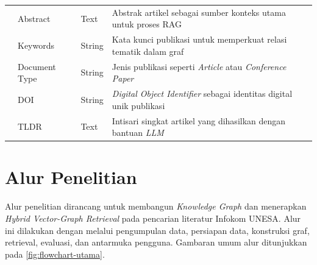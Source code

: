 \begin{longtable}{P{0.14\textwidth}>{\raggedright\arraybackslash}p{0.20\textwidth}P{0.12\textwidth}>{\raggedright\arraybackslash}p{0.40\textwidth}}
                              & Abstract              & Text               & Abstrak artikel sebagai sumber konteks utama untuk proses RAG                       \\ 
                              & Keywords              & String             & Kata kunci publikasi untuk memperkuat relasi tematik dalam graf                     \\ 
                              & Document Type         & String             & Jenis publikasi seperti \textit{Article} atau \textit{Conference Paper}             \\ 
                              & DOI                   & String             & \textit{Digital Object Identifier} sebagai identitas digital unik publikasi         \\ 
                              & TLDR                  & Text               & Intisari singkat artikel yang dihasilkan dengan bantuan \textit{LLM}                \\
\end{longtable}
\endgroup

\section{Alur Penelitian}

Alur penelitian dirancang untuk membangun \textit{Knowledge Graph} dan menerapkan \textit{Hybrid Vector-Graph Retrieval} pada pencarian literatur Infokom UNESA. Alur ini dilakukan dengan melalui pengumpulan data, persiapan data, konstruksi graf, retrieval, evaluasi, dan antarmuka pengguna. Gambaran umum alur ditunjukkan pada \ref{fig:flowchart-utama}.


